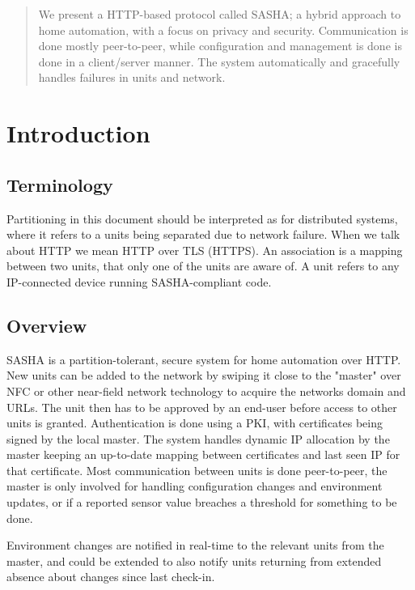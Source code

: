 \begin{abstract}

We present a HTTP-based protocol called SASHA; a hybrid approach to home automation, with a focus on privacy and security. Communication is done mostly peer-to-peer, while configuration and management is done is done in a client/server manner. The system automatically and gracefully handles failures in units and network.

\end{abstract}

\section{Introduction}

\subsection{Terminology}
Partitioning in this document should be interpreted as for distributed systems, where it refers to a units being separated due to network failure. When we talk about HTTP we mean HTTP over TLS (HTTPS). An association is a mapping between two units, that only one of the units are aware of. A unit refers to any IP-connected device running SASHA-compliant code.

\subsection{Overview}
SASHA is a partition-tolerant, secure system for home automation over HTTP. New units can be added to the network by swiping it close to the "master" over NFC or other near-field network technology to acquire the networks domain and URLs. The unit then has to be approved by an end-user before access to other units is granted. Authentication is done using a PKI, with certificates being signed by the local master. The system handles dynamic IP allocation by the master keeping an up-to-date mapping between certificates and last seen IP for that certificate. Most communication between units is done peer-to-peer, the master is only involved for handling configuration changes and environment updates, or if a reported sensor value breaches a threshold for something to be done.

Environment changes are notified in real-time to the relevant units from the master, and could be extended to also notify units returning from extended absence about changes since last check-in.

